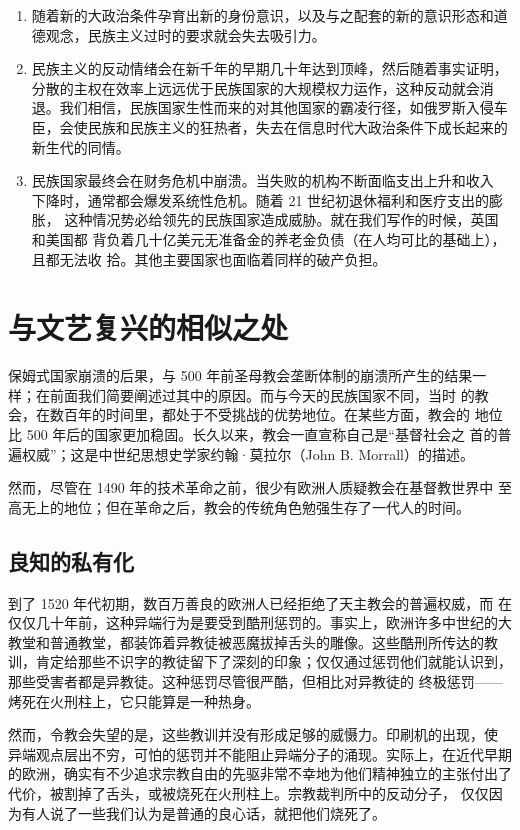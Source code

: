 \begin{enumerate}
\begin{itemize}
    \end{itemize}
    \item 随着新的大政治条件孕育出新的身份意识，以及与之配套的新的意识形态和道德观念，民族主义过时的要求就会失去吸引力。
    \item 民族主义的反动情绪会在新千年的早期几十年达到顶峰，然后随着事实证明，分散的主权在效率上远远优于民族国家的大规模权力运作，这种反动就会消退。我们相信，民族国家生性而来的对其他国家的霸凌行径，如俄罗斯入侵车臣，会使民族和民族主义的狂热者，失去在信息时代大政治条件下成长起来的新生代的同情。
    \item 民族国家最终会在财务危机中崩溃。当失败的机构不断面临支出上升和收入 下降时，通常都会爆发系统性危机。随着 21 世纪初退休福利和医疗支出的膨胀， 这种情况势必给领先的民族国家造成威胁。就在我们写作的时候，英国和美国都 背负着几十亿美元无准备金的养老金负债（在人均可比的基础上），且都无法收 拾。其他主要国家也面临着同样的破产负担。
\end{enumerate}


\section{与文艺复兴的相似之处}
保姆式国家崩溃的后果，与 500 年前圣母教会垄断体制的崩溃所产生的结果一样；在前面我们简要阐述过其中的原因。而与今天的民族国家不同，当时 的教会，在数百年的时间里，都处于不受挑战的优势地位。在某些方面，教会的 地位比 500 年后的国家更加稳固。长久以来，教会一直宣称自己是“基督社会之 首的普遍权威”；这是中世纪思想史学家约翰·莫拉尔（John B. Morrall）的描述。

然而，尽管在 1490 年的技术革命之前，很少有欧洲人质疑教会在基督教世界中 至高无上的地位；但在革命之后，教会的传统角色勉强生存了一代人的时间。

\subsection{良知的私有化}

到了 1520 年代初期，数百万善良的欧洲人已经拒绝了天主教会的普遍权威，而 在仅仅几十年前，这种异端行为是要受到酷刑惩罚的。事实上，欧洲许多中世纪的大教堂和普通教堂，都装饰着异教徒被恶魔拔掉舌头的雕像。这些酷刑所传达的教训，肯定给那些不识字的教徒留下了深刻的印象；仅仅通过惩罚他们就能认识到，那些受害者都是异教徒。这种惩罚尽管很严酷，但相比对异教徒的 终极惩罚——烤死在火刑柱上，它只能算是一种热身。

然而，令教会失望的是，这些教训并没有形成足够的威慑力。印刷机的出现，使 异端观点层出不穷，可怕的惩罚并不能阻止异端分子的涌现。实际上，在近代早期的欧洲，确实有不少追求宗教自由的先驱非常不幸地为他们精神独立的主张付出了代价，被割掉了舌头，或被烧死在火刑柱上。宗教裁判所中的反动分子， 仅仅因为有人说了一些我们认为是普通的良心话，就把他们烧死了。

